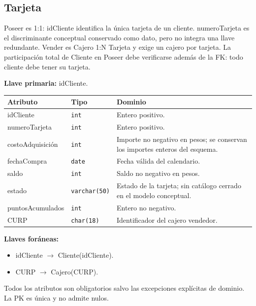 \par\noindent\begin{minipage}{\textwidth}
\subsection{Tarjeta}
Poseer es 1:1: idCliente identifica la única tarjeta de un cliente. numeroTarjeta es el discriminante conceptual conservado como dato, pero no integra una llave redundante. Vender es Cajero 1:N Tarjeta y exige un cajero por tarjeta. La participación total de Cliente en Poseer debe verificarse además de la FK: todo cliente debe tener su tarjeta.\par
\textbf{Llave primaria:} idCliente.\par
{\small\begin{tabular}{@{}p{}p{}p{}@{}}
\toprule Atributo & Tipo & Dominio \\ \midrule
idCliente & \texttt{int} & Entero positivo. \\
numeroTarjeta & \texttt{int} & Entero positivo. \\
costoAdquisición & \texttt{int} & Importe no negativo en pesos; se conservan los importes enteros del esquema. \\
fechaCompra & \texttt{date} & Fecha válida del calendario. \\
saldo & \texttt{int} & Saldo no negativo en pesos. \\
estado & \texttt{varchar(50)} & Estado de la tarjeta; sin catálogo cerrado en el modelo conceptual. \\
puntosAcumulados & \texttt{int} & Entero no negativo. \\
CURP & \texttt{char(18)} & Identificador del cajero vendedor. \\
\bottomrule\end{tabular}}
\textbf{Llaves foráneas:}\begin{itemize}[nosep]
\item idCliente $\rightarrow$ Cliente(idCliente).
\item CURP $\rightarrow$ Cajero(CURP).
\end{itemize}
Todos los atributos son obligatorios salvo las excepciones explícitas de dominio. La PK es única y no admite nulos.
\end{minipage}\par\vspace{.35cm}
